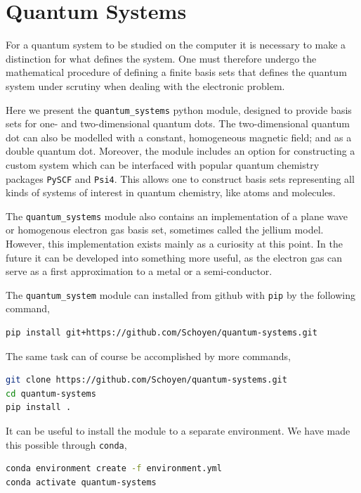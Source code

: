 \chapter{Quantum Systems}

For a quantum system to be studied on the computer it is necessary to 
make a distinction for what defines the system. One must therefore undergo the
mathematical procedure of defining a finite basis sets that defines the 
quantum system under scrutiny when dealing with the electronic problem. 

Here we present the \lstinline{quantum_systems} python module, designed to 
provide basis sets for one- and two-dimensional quantum dots. The two-dimensional 
quantum dot can also be modelled with a constant, homogeneous magnetic field; and 
as a double quantum dot. 
Moreover, the module includes an option for constructing a custom system which can 
be interfaced with popular quantum chemistry packages \lstinline{PySCF}\cite{PYSCF} 
and \lstinline{Psi4}\cite{parrish2017psi4}. This allows one to construct basis sets 
representing all kinds of systems of interest in quantum chemistry, like atoms and 
molecules. 

The \lstinline{quantum_systems} module also contains an implementation of 
a plane wave or homogenous electron gas basis set, sometimes called the 
jellium model. However, this implementation exists mainly as 
a curiosity at this point. In the future it can be developed into something more useful,
as the electron gas can serve as a first approximation to a metal or a semi-conductor.

The \lstinline{quantum_system} module can installed from github with \lstinline{pip}
by the following command,
\begin{lstlisting}[language=bash]
pip install git+https://github.com/Schoyen/quantum-systems.git
\end{lstlisting}
The same task can of course be accomplished by more commands,
\begin{lstlisting}[language=bash]
git clone https://github.com/Schoyen/quantum-systems.git
cd quantum-systems
pip install .
\end{lstlisting}


It can be useful to install the module to a separate environment. We have made this 
possible through \lstinline{conda},
\begin{lstlisting}[language=bash]
conda environment create -f environment.yml
conda activate quantum-systems    
\end{lstlisting}

